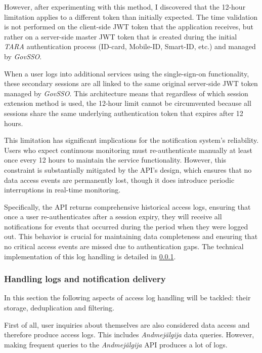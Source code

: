 However, after experimenting with this method, I discovered that the 12-hour limitation applies to a different token than initially expected. The time validation is not performed on the client-side JWT token that the application receives, but rather on a server-side master JWT token that is created during the initial \textit{TARA} authentication process (ID-card, Mobile-ID, Smart-ID, etc.) and managed by \textit{GovSSO}.

When a user logs into additional services using the single-sign-on functionality, these secondary sessions are all linked to the same original server-side JWT token managed by \textit{GovSSO}. This architecture means that regardless of which session extension method is used, the 12-hour limit cannot be circumvented because all sessions share the same underlying authentication token that expires after 12 hours.

This limitation has significant implications for the notification system's reliability. Users who expect continuous monitoring must re-authenticate manually at least once every 12 hours to maintain the service functionality. However, this constraint is substantially mitigated by the API's design, which ensures that no data access events are permanently lost, though it does introduce periodic interruptions in real-time monitoring.

Specifically, the API returns comprehensive historical access logs, ensuring that once a user re-authenticates after a session expiry, they will receive all notifications for events that occurred during the period when they were logged out. This behavior is crucial for maintaining data completeness and ensuring that no critical access events are missed due to authentication gaps. The technical implementation of this log handling is detailed in \ref{log-handling}.

\subsubsection{Handling logs and notification delivery}
\label{log-handling}
In this section the following aspects of access log handling will be tackled: their storage, deduplication and filtering.

First of all, user inquiries about themselves are also considered data access and therefore produce access logs. This includes \textit{Andmejälgija} data queries. However, making frequent queries to the \textit{Andmejälgija} API produces a lot of logs. 

